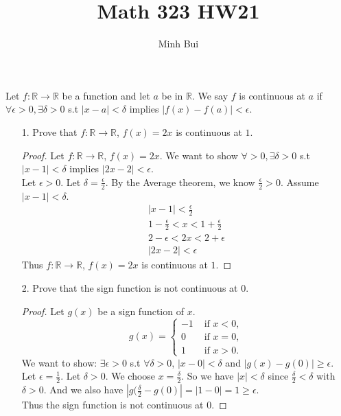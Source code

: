 \documentclass{article}
\author{Minh Bui}
\title{Math 323 HW21}
\theoremstyle{claim}
\theoremstyle{definition}
\begin{document}
\maketitle
Let $f: \mathbb{R} \rightarrow \mathbb{R}$ be a function and let $a$ be in $\mathbb{R}$. We say $f$ is continuous at $a$ if $\forall \epsilon > 0, \exists \delta > 0$ s.t $ |x - a| < \delta$ implies $|f(x) - f(a)| < \epsilon$.
\begin{enumerate}
    \item[1.] Prove that $f: \mathbb{R} \rightarrow \mathbb{R}$, $f(x) = 2x$ is continuous at $1$.
        \begin{proof}
            Let $f: \mathbb{R} \rightarrow \mathbb{R}$, $f(x) = 2x$. We want to show $\forall > 0, \exists \delta > 0$ s.t $|x - 1| < \delta$ implies $|2x - 2| < \epsilon$.\\
            Let $\epsilon > 0$. Let $\delta = \frac{\epsilon}{2}$. By the Average theorem, we know $\frac{\epsilon}{2} > 0$. Assume $|x - 1| < \delta$.
            \begin{gather*}
                |x - 1| < \frac{\epsilon}{2}\\
                1 - \frac{\epsilon}{2} < x < 1 + \frac{\epsilon}{2}\\
                2 - \epsilon < 2x < 2 + \epsilon\\
                |2x - 2| < \epsilon
            \end{gather*}
        Thus $f:\mathbb{R} \rightarrow \mathbb{R}$, $f(x) = 2x$ is continuous at $1$.
    \end{proof}
    \item[2.] Prove that the sign function is not continuous at $0$.
    \begin{proof}
        Let $g(x)$ be a sign function of $x$.
        \begin{equation*}
            g(x) = \left\{
                \begin{array}{rl}
                    -1 & \text{ if } x < 0,\\
                    0 & \text{ if } x = 0,\\
                    1 & \text{ if } x > 0.
                \end{array} \right.
        \end{equation*}
        We want to show: $\exists \epsilon > 0$ s.t $\forall \delta > 0$, $|x - 0| < \delta$ and $ |g(x) - g(0)| \ge \epsilon$.\\
        Let $\epsilon = \frac{1}{2}$. Let $\delta > 0$. We choose $x = \frac{\delta}{2}$. So we have $|x| < \delta$ since $\frac{\delta}{2} < \delta$ with $\delta > 0$. And we also have $|g(\frac{\delta}{2} - g(0)| = |1 - 0| = 1 \ge \epsilon$.\\
        Thus the sign function is not continuous at $0$.
    \end{proof}
\end{enumerate}
\end{document}
